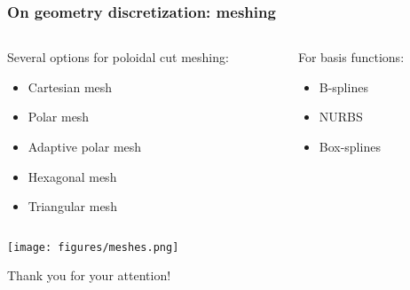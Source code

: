 \documentclass[10pt]{beamer}
\begin{document}
\begin{frame}
\frametitle{On geometry discretization: meshing}


\begin{columns}
\begin{column}{0.6\textwidth}
Several options for poloidal cut meshing:

\begin{itemize}
	\item Cartesian mesh
	\item Polar mesh
	\item Adaptive polar mesh
	\item Hexagonal mesh
	\item Triangular mesh
\end{itemize}

\end{column}
\begin{column}{0.4\textwidth}

For basis functions:

\begin{itemize}
	\item B-splines
	\item NURBS
	\item Box-splines
\end{itemize}
\end{column}
\end{columns}



\begin{center}
    	\texttt{[image: figures/meshes.png]}
\end{center}
\vspace{-0.5cm}
\end{frame}




\begin{frame}
\centering
\Huge{Thank you for your attention!}
\end{frame}


\end{document}
